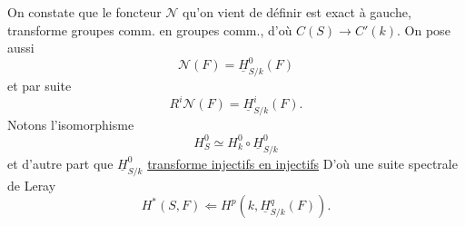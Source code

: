 
On constate que le foncteur $\mathcal N$ qu'on vient de définir est exact
à gauche,  transforme groupes comm. en groupes comm., d'où
$C(S)\longrightarrow C'(k)$. On pose aussi
\[
\mathcal N(F)=\underline H^0_{S/k}(F)
\]
et  par suite
\[
R^i\mathcal N(F)=\underline H^i_{S/k}(F).
\]
Notons l'isomorphisme
\[
H^0_S\simeq H^0_k\circ\underline H^0_{S/k}
\]
et d'autre part que $\underline H^0_{S/k}$ \uline{transforme injectifs en injectifs}
D'où une suite spectrale de Leray
\[
H^*(S,F)\Longleftarrow H^p(k,\underline H^q_{S/k}(F)).
\]

